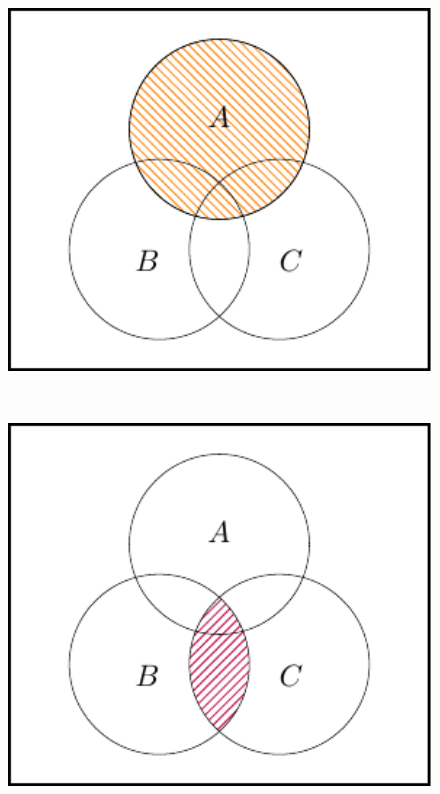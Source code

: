 \documentclass[
  letterpaper,
]{report}
\theoremstyle{definition}
\theoremstyle{definition}
\theoremstyle{remark}
\begin{document}
\begin{figure}

{\centering \includegraphics[width=1\textwidth,height=\textheight]{sections/L03-events_files/figure-pdf/dist1-1.pdf}

}

\end{figure}

~

\begin{figure}

{\centering \includegraphics[width=1\textwidth,height=\textheight]{sections/L03-events_files/figure-pdf/dist2-1.pdf}

}

\end{figure}
\end{document}
